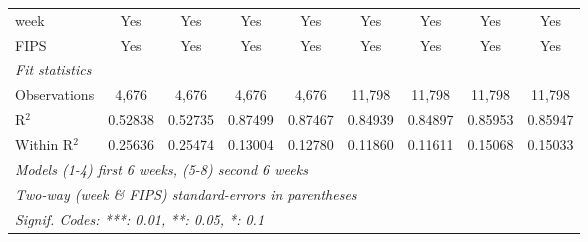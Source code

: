 \documentclass{article}
\begin{document}
\begin{landscape}
\begin{table}
\begin{tabular}{lcccccccc}
    week & Yes & Yes & Yes & Yes & Yes & Yes & Yes & Yes\\
    FIPS & Yes & Yes & Yes & Yes & Yes & Yes & Yes & Yes\\
    \midrule \emph{Fit statistics}&  & & & & & & & \\
    Observations & 4,676&4,676&4,676&4,676&11,798&11,798&11,798&11,798\\
    R$^2$ & 0.52838&0.52735&0.87499&0.87467&0.84939&0.84897&0.85953&0.85947\\
    Within R$^2$ & 0.25636&0.25474&0.13004&0.12780&0.11860&0.11611&0.15068&0.15033\\
    \midrule\midrule
    \multicolumn{9}{l}{\emph{Models (1-4) first 6 weeks, (5-8) second 6 weeks}}\\
    \multicolumn{9}{l}{\emph{Two-way (week \& FIPS) standard-errors in parentheses}}\\
    \multicolumn{9}{l}{\emph{Signif. Codes: ***: 0.01, **: 0.05, *: 0.1}}\\
    \end{tabular}
  \end{table}



\end{landscape}
\end{document}
